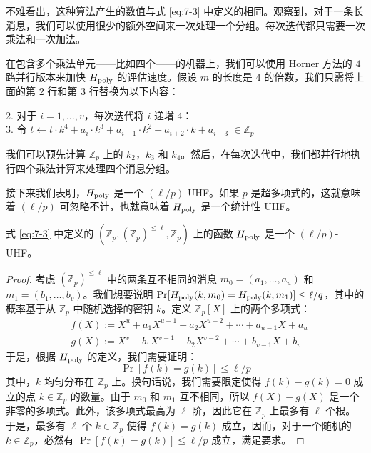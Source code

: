 \vspace{5pt}

\noindent
不难看出，这种算法产生的数值与式 \ref{eq:7-3} 中定义的相同。观察到，对于一条长消息，我们可以使用很少的额外空间来一次处理一个分组。每次迭代都只需要一次乘法和一次加法。
 
在包含多个乘法单元——比如四个——的机器上，我们可以使用 Horner 方法的 $4$ 路并行版本来加快 $H_{\rm poly}$ 的评估速度。假设 $m$ 的长度是 $4$ 的倍数，我们只需将上面的第 $2$ 行和第 $3$ 行替换为以下内容：

\vspace{5pt}

\hspace*{5pt} 2. \quad 对于 $i=1,\dots,v$，每次迭代将 $i$ 递增 $4$：\\
\hspace*{26pt} 3. \quad\quad\quad 令 $t\leftarrow t\cdot k^4+a_i\cdot k^3+a_{i+1}\cdot k^2+a_{i+2}\cdot k+a_{i+3}\;\in\mathbb{Z}_p$

\vspace{5pt}

\noindent
我们可以预先计算 $\mathbb{Z}_p$ 上的 $k_2$，$k_3$ 和 $k_4$。然后，在每次迭代中，我们都并行地执行四个乘法计算来处理四个消息分组。

\begin{snote}
接下来我们表明，$H_{\rm poly}$ 是一个 ${(\ell/p)}$-UHF。如果 $p$ 是超多项式的，这就意味着 ${(\ell/p)}$ 可忽略不计，也就意味着 $H_{\rm poly}$ 是一个统计性 UHF。
\end{snote}

\begin{lemma}\label{lemma:7-2}
式 \ref{eq:7-3} 中定义的 $(\mathbb{Z}_p,(\mathbb{Z}_p)^{\leq\ell},\mathbb{Z}_p)$ 上的函数 $H_{\rm poly}$ 是一个 ${(\ell/p)}$-UHF。
\end{lemma}

\begin{proof}
考虑 $(\mathbb{Z}_p)^{\leq\ell}$ 中的两条互不相同的消息 $m_0=(a_1,\dots,a_u)$  和 $m_1=(b_1,\dots,b_v)$。我们想要说明 $\Pr[H_{\rm poly} (k,m_0) = H_{\rm poly} (k,m_1)] \leq {\ell/q}$，其中的概率基于从 $\mathbb{Z}_p$ 中随机选择的密钥 $k$。定义 $\mathbb{Z}_p[X]$ 上的两个多项式：
\begin{equation}	\label{eq:7-4}
\begin{aligned}
& f(X):=X^u+a_1X^{u-1}+a_2X^{u-2}+\cdots+a_{u-1}X+a_u\\
& g(X):=X^v+b_1X^{v-1}+b_2X^{v-2}+\cdots+b_{v-1}X+b_v
\end{aligned}
\end{equation}
于是，根据 $H_{\rm poly}$ 的定义，我们需要证明：
\[
\Pr[f(k)=g(k)]\leq{\ell/p}
\]
其中，$k$ 均匀分布在 $\mathbb{Z}_p$ 上。换句话说，我们需要限定使得 $f(k)-g(k)=0$ 成立的点 $k\in\mathbb{Z}_p$ 的数量。由于 $m_0$ 和 $m_1$ 互不相同，所以 $f(X)-g(X)$ 是一个非零的多项式。此外，该多项式最高为 $\ell$ 阶，因此它在 $\mathbb{Z}_p$ 上最多有 $\ell$ 个根。于是，最多有 $\ell$ 个 $k\in\mathbb{Z}_p$ 使得 $f(k)=g(k)$ 成立，因而，对于一个随机的 $k\in\mathbb{Z}_p$，必然有 $\Pr[f(k)=g(k)]\leq{\ell/p}$ 成立，满足要求。
\end{proof}

